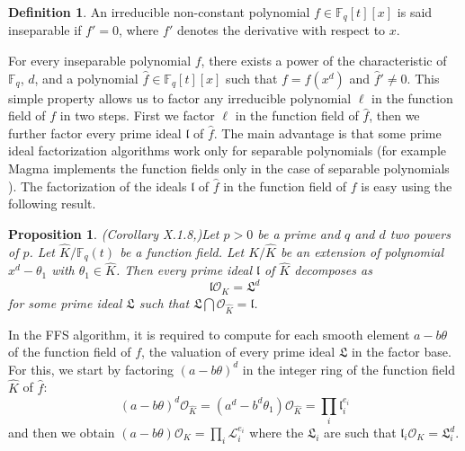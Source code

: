 \documentclass[a4wide]{article}
\newcommand{\F}{{\mathbb F}}
\newcommand{\OO}{{\mathcal O}}
\theoremstyle{plain}
\newtheorem{prop}[theo]{Proposition}
\theoremstyle{definition}
\newtheorem{deff}[theo]{Definition}
\theoremstyle{remark}
\begin{document}
\begin{deff}
	An irreducible non-constant polynomial $f\in\F_q[t][x]$ is said inseparable if
	$f'=0$, where $f'$ denotes the derivative with respect to $x$.
\end{deff}

	For every inseparable polynomial $f$, there exists a power of the
	characteristic of $\F_q$, $d$, and a polynomial
	$\hat{f}\in\F_q[t][x]$ such that $f=\hat{f}(x^d)$ and $\hat{f}'\neq
	0$. This simple property allows us to factor any irreducible
	polynomial $\ell$ in the function field of $f$ in two steps. First
	we factor $\ell$ in the function field of $\hat{f}$, then we further
	factor every prime ideal $\mathfrak{l}$ of $\hat{f}$. The main
	advantage is that some prime ideal factorization algorithms work
	only for separable polynomials (for example
	Magma implements the function fields only in the case of separable polynomials 
	\cite{MR1484478}). The factorization of the ideals $\mathfrak{l}$ of
	$\hat{f}$ in the function field of $f$ is easy using the following
	result.

	\begin{prop}(Corollary X.1.8,\cite{Lorenzini})\label{prop:lL} Let $p>0$ be a prime and $q$
	and $d$ two powers of $p$. Let $\hat{K}/\F_q(t)$ be a function field. Let
	$K/\hat{K}$ be an extension of polynomial $x^d-\theta_1$ with
	$\theta_1\in \hat{K}$. Then
	every prime ideal $\mathfrak{l}$ of $\hat{K}$ decomposes as
	\begin{equation}\label{lL}
	\mathfrak{l}\mathcal{O}_K=\mathfrak{L}^d
\end{equation}
for some prime ideal $\mathfrak{L}$ such that $\mathfrak{L}\bigcap
\mathcal{O}_{\hat{K}}=\mathfrak{l}$.
\end{prop}

In the FFS algorithm, it is required to compute for each smooth element
$a-b\theta$ of the function field of $f$, the valuation of every prime ideal
$\mathfrak{L}$ in the factor base. For this, we start by factoring
$(a-b\theta)^d$ in the integer ring of the function field $\hat{K}$ of
$\hat{f}$:
$$(a-b\theta)^d\OO_{\hat{K}}=(a^d-b^d\theta_1)\mathcal{O}_{\hat{K}}=\prod_i
\mathfrak{l}_i^{e_i}$$ and then we obtain $(a-b\theta)\mathcal{O}_K=\prod_i
\mathcal{L}_i^{e_i}$ where the $\mathfrak{L}_i$ are such that
$\mathfrak{l}_i\mathcal{O}_K=\mathfrak{L}_i^d$. 
\end{document}
